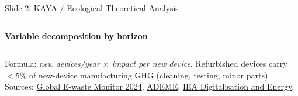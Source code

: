 \documentclass[aspectratio=169]{beamer}
\begin{document}
\begin{frame}{Slide 2: KAYA / Ecological Theoretical Analysis}
\begin{columns}[T,totalwidth=\textwidth]
\textbf{Variable decomposition by horizon}
\end{columns}
\vspace{0.08cm}
\tiny Formula: \textit{new devices/year $\times$ impact per new device}. Refurbished devices carry $<$5\% of new-device manufacturing GHG (cleaning, testing, minor parts). Sources: \href{https://ewastemonitor.info/the-global-e-waste-monitor-2024/}{Global E-waste Monitor 2024}, \href{https://librairie.ademe.fr/}{ADEME}, \href{https://www.iea.org/reports/digitalisation-and-energy}{IEA Digitalisation and Energy}.
\end{frame}

\end{document}

